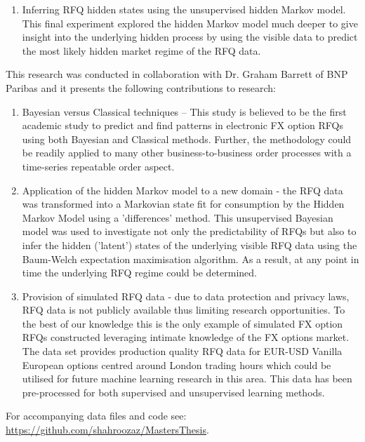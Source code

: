 \begin{singlespacing}
\begin{enumerate}
\item Inferring RFQ hidden states using the unsupervised hidden Markov model. This final experiment explored the hidden Markov model much deeper to give insight into the underlying hidden process by using the visible data to predict the most likely hidden market regime of the RFQ data.

\end{enumerate}

This research was conducted in collaboration with Dr. Graham Barrett of BNP Paribas and it presents the following contributions to research:
\begin{enumerate}

\item Bayesian versus Classical techniques -- This study is believed to be the
first academic study to predict and find patterns in electronic FX option RFQs using both Bayesian and Classical methods. Further, the methodology could be readily applied to many other business-to-business order processes with a time-series repeatable order aspect.

\item Application of the hidden Markov model to a new domain - the RFQ data
was transformed into a Markovian state fit for consumption by the Hidden
Markov Model using a 'differences' method. This unsupervised Bayesian
model was used to investigate not only the predictability of RFQs but also
to infer the hidden ('latent') states of the underlying visible RFQ data
using the Baum-Welch expectation maximisation algorithm. As a
result, at any point in time the underlying RFQ regime could be determined.

\item Provision of simulated RFQ data - due to data protection and privacy
laws, RFQ data is not publicly available thus limiting research
opportunities. To the best of our knowledge this is the only example of
simulated FX option RFQs constructed leveraging intimate knowledge of the FX
options market. The data set provides production quality RFQ data for EUR-USD
Vanilla European options centred around London trading hours which could be
utilised for future machine learning research in this area. This data has
been pre-processed for both supervised and unsupervised learning methods.

\end{enumerate}
For accompanying data files and code see: \url{https://github.com/shahroozaz/MastersThesis}.

\end{singlespacing}
